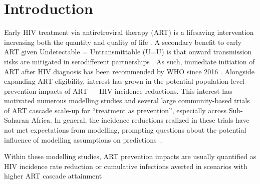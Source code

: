 \section{Introduction}\label{art.intro}
Early HIV treatment via antiretroviral therapy (ART)
is a lifesaving intervention increasing both the quantity and quality of life
\cite{Gabillard2013,Maartens2014,Danel2015,Lundgren2015init}.
A secondary benefit to early ART given Undetectable = Untransmittable (U=U) is that
onward transmission risks are mitigated in serodifferent partnerships
\cite{Anglemyer2013,Cohen2016,Rodger2019}.
As such, immediate initiation of ART after HIV diagnosis
has been recommended by WHO since 2016 \cite{WHO2016art}.
Alongside expanding ART eligibility, interest has grown in
the potential population-level prevention impacts of ART --- \ie HIV incidence reductions.
This interest has motivated
numerous modelling studies \cite{Granich2009,Eaton2012,Eaton2014art,Knight2022sr} and
several large community-based trials \cite{Makhema2019,Havlir2019,Hayes2019,Iwuji2018}
of ART cascade scale-up for ``treatment as prevention'',
especially across Sub-Saharan Africa.
In general, the incidence reductions realized in these trials
have not met expectations from modelling, prompting questions about
the potential influence of modelling assumptions on predictions~\cite{Baral2019}.
\par
Within these modelling studies, ART prevention impacts are usually quantified as
HIV incidence rate reduction or cumulative infections averted in
scenarios with higher ART cascade attainment \vs
